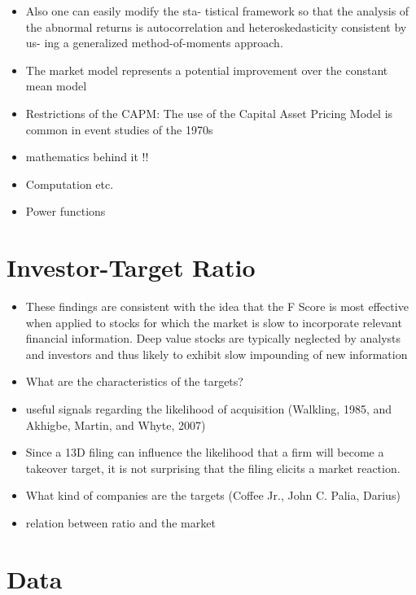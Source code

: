 \documentclass[12pt]{article}
\begin{document}
\begin{itemize}
        \item Also one can easily modify the sta- tistical framework so that the analysis of the abnormal returns is autocorrelation and heteroskedasticity consistent by us- ing a generalized method-of-moments approach.\citep{MacKinlay1997}
        \item The market model represents a potential improvement over the constant mean model \citep{MacKinlay1997}
        \item Restrictions of the CAPM: The use of the Capital Asset Pricing Model is common in event studies of the 1970s \citep{MacKinlay1997} 
        \item mathematics behind it !! 
        \item Computation etc.
        \item Power functions 
    \end{itemize}

\section{Investor-Target Ratio} 

    \begin{itemize}
        \item These findings are consistent with the idea that the F Score is most effective when applied to stocks for which the market is slow to incorporate relevant financial information. Deep value stocks are typically neglected by analysts and investors and thus likely to exhibit slow impounding of new information \citep{Hyde2014}
        \item What are the characteristics of the targets?
        \item useful signals regarding the likelihood of acquisition
        (Walkling, 1985, and Akhigbe, Martin, and Whyte, 2007) \citep{Brigida2012}
        \item Since a 13D filing can influence the likelihood that a firm will become a takeover target, it is not surprising that the filing elicits a market reaction.\citep{Brigida2012}
        \item What kind of companies are the targets (Coffee Jr., John C.
        Palia, Darius)
        \item relation between ratio and the market 
    \end{itemize}

\section{Data}
\end{document}
